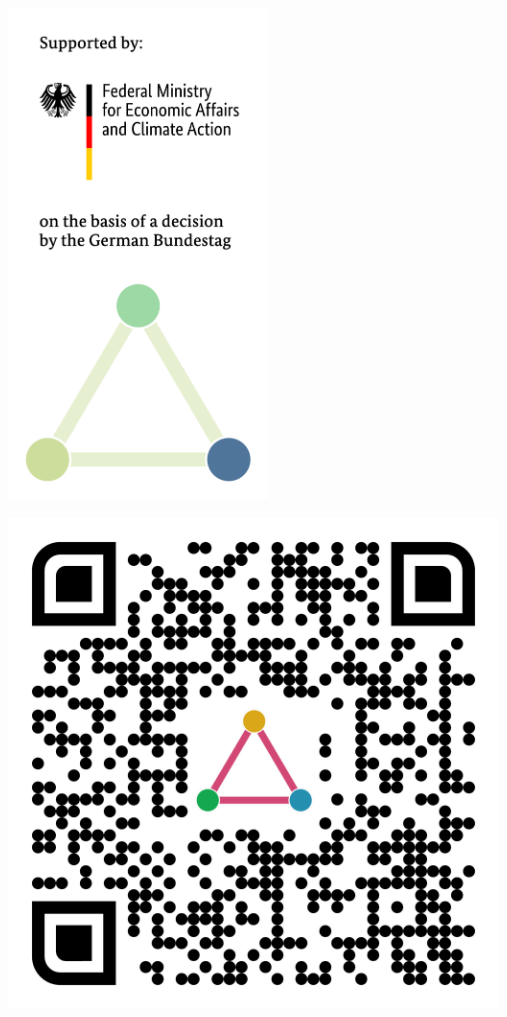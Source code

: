 \documentclass[a0,portrait]{a0poster}
\begin{document}
\begin{minipage}[b][2cm][t]{0.3\linewidth} %
    \begin{minipage}[t]{0.3\linewidth}
        \includegraphics[height=13cm]{resilient_bmwk_logo.png}
    \end{minipage}
    \hfill
    \begin{minipage}[t]{0.7\linewidth}
        \includegraphics[height=13cm]{qr.pdf}
    \end{minipage}%
\end{minipage}
\end{document}
